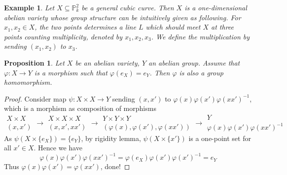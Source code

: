 \documentclass{ctexart}
\newtheorem{proposition}{Proposition}[section]
\newtheorem{example}{Example}[section]
\begin{document}
\begin{example}
    Let $X \subseteq \mathbb{P}_{k}^{2}$ be a general cubic curve.
    Then $X$ is a one-dimensional abelian variety whose group structure can be intuitively given as following.
    For $x_{1},x_{2}\in X$, the two points determines a line $L$ which should meet $X$ at three points counting multiplicity, denoted by $x_{1}, x_{2}, x_{3}$.
    We define the multiplication by sending $(x_{1}, x_{2})$ to $x_{3}$.
\end{example}
\begin{proposition}
    Let $X$ be an abelian variety, $Y$ an abelian group.
    Assume that $\varphi: X \rightarrow Y$ is a morphism such that $\varphi(e_{X}) = e_{Y}$.
    Then $\varphi$ is also a group homomorphism.
    \label{Proposition 4.7}
\end{proposition}
\begin{proof}
    Consider map $\psi: X \times X \rightarrow Y$ sending $(x, x')$ to $\varphi(x)\varphi(x')\varphi(xx')^{-1}$,
    which is a morphism as composition of morphisms
    \begin{equation}
        \begin{gathered}
            X \times X \\
            (x, x')
        \end{gathered}
        \rightarrow
        \begin{gathered}
            X \times X \times X \\
            (x, x', xx')
        \end{gathered}
        \rightarrow
        \begin{gathered}
            Y \times Y \times Y \\
            (\varphi(x), \varphi(x'), \varphi(xx'))
        \end{gathered}
        \rightarrow
        \begin{gathered}
            Y \\
            \varphi(x)\varphi(x')\varphi(xx')^{-1}
        \end{gathered}
    \end{equation}
    As $\psi(X \times \{e_{X}\}) = \{e_{Y}\}$, by rigidity lemma,
    $\psi(X \times \{x'\})$ is a one-point set for all $x'\in X$.
    Hence we have
    \begin{equation}
        \varphi(x)\varphi(x')\varphi(xx')^{-1} = \varphi(e_{X})\varphi(x')\varphi(x')^{-1} = e_{Y}
    \end{equation}
    Thus $\varphi(x)\varphi(x') = \varphi(xx')$, done!
\end{proof}
\end{document}
